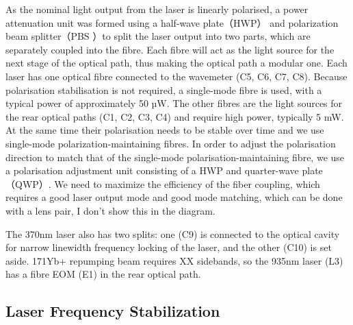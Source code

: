 As the nominal light output from the laser is linearly polarised, a power attenuation unit was formed using a half-wave plate（HWP） and polarization beam splitter（PBS ）to split the laser output into two parts, which are separately coupled into the fibre. Each fibre will act as the light source for the next stage of the optical path, thus making the optical path a modular one. Each laser has one optical fibre connected to the wavemeter (C5, C6, C7, C8). Because polarisation stabilisation is not required, a single-mode fibre is used, with a typical power of approximately 50 µW. The other fibres are the light sources for the rear optical paths (C1, C2, C3, C4) and require high power, typically 5 mW. At the same time their polarisation needs to be stable over time and we use single-mode polarization-maintaining fibres. In order to adjust the polarisation direction to match that of the single-mode polarisation-maintaining fibre, we use a polarisation adjustment unit consisting of a HWP and quarter-wave plate（QWP）. We need to maximize the efficiency of the fiber coupling, which requires a good laser output mode and good mode matching, which can be done with a lens pair, I don't show this in the diagram.

The 370nm laser also has two splits: one (C9) is connected to the optical cavity for narrow linewidth frequency locking of the laser, and the other (C10) is set aside. 171Yb+ repumping beam requires XX sidebands, so the 935nm laser (L3) has a fibre EOM (E1) in the rear optical path.

\subsection{Laser Frequency Stabilization}


